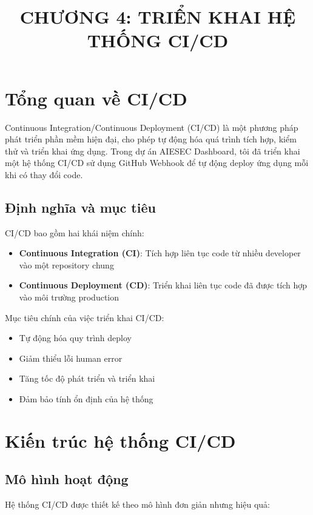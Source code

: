\documentclass[12pt,a4paper]{article}
\title{\textbf{CHƯƠNG 4: TRIỂN KHAI HỆ THỐNG CI/CD}}
\author{}
\date{}
\begin{document}
\maketitle

\section{Tổng quan về CI/CD}

Continuous Integration/Continuous Deployment (CI/CD) là một phương pháp phát triển phần mềm hiện đại, cho phép tự động hóa quá trình tích hợp, kiểm thử và triển khai ứng dụng. Trong dự án AIESEC Dashboard, tôi đã triển khai một hệ thống CI/CD sử dụng GitHub Webhook để tự động deploy ứng dụng mỗi khi có thay đổi code.

\subsection{Định nghĩa và mục tiêu}

CI/CD bao gồm hai khái niệm chính:
\begin{itemize}
    \item \textbf{Continuous Integration (CI)}: Tích hợp liên tục code từ nhiều developer vào một repository chung
    \item \textbf{Continuous Deployment (CD)}: Triển khai liên tục code đã được tích hợp vào môi trường production
\end{itemize}

Mục tiêu chính của việc triển khai CI/CD:
\begin{itemize}
    \item Tự động hóa quy trình deploy
    \item Giảm thiểu lỗi human error
    \item Tăng tốc độ phát triển và triển khai
    \item Đảm bảo tính ổn định của hệ thống
\end{itemize}

\section{Kiến trúc hệ thống CI/CD}

\subsection{Mô hình hoạt động}

Hệ thống CI/CD được thiết kế theo mô hình đơn giản nhưng hiệu quả:
\end{document}
